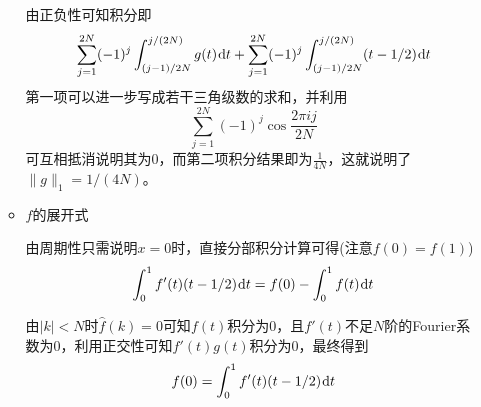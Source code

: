 \documentclass[a4paper,UTF8,fontset=windows]{ctexart}
\newcommand*{\dr}{\hspace{0.07em}\mathrm{d}}
\begin{document}
\begin{enumerate}
\begin{itemize}
        由正负性可知积分即
        $$\sum_{j=1}^{2N}(-1)^j\int_{(j-1)/2N}^{j/(2N)}g(t)\dr t+\sum_{j=1}^{2N}(-1)^j\int_{(j-1)/2N}^{j/(2N)}(t-1/2)\dr t$$
        第一项可以进一步写成若干三角级数的求和，并利用
        $$\sum_{j=1}^{2N}(-1)^j\cos\frac{2\pi ij}{2N}$$
        可互相抵消说明其为0，而第二项积分结果即为$\frac{1}{4N}$，这就说明了$\|g\|_1=1/(4N)$。

        \item $f$的展开式
        
        由周期性只需说明$x=0$时，直接分部积分计算可得(注意$f(0)=f(1)$)
        $$\int_0^1f'(t)(t-1/2)\dr t=f(0)-\int_0^1f(t)\dr t$$

        由$|k|<N$时$\hat{f}(k)=0$可知$f(t)$积分为0，且$f'(t)$不足$N$阶的Fourier系数为0，利用正交性可知$f'(t)g(t)$积分为0，最终得到
        $$f(0)=\int_0^1f'(t)(t-1/2)\dr t$$
    \end{itemize}
\end{enumerate}
\end{document}
